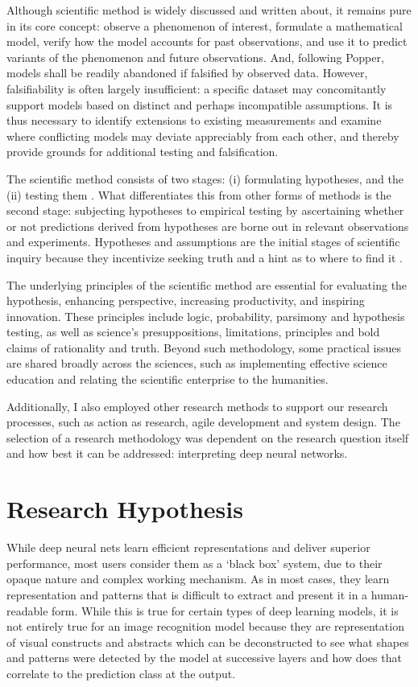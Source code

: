 Although scientific method \cite{2016397} is widely discussed and written about, it remains pure in its core concept: observe a phenomenon of interest, formulate a mathematical model, verify how the model accounts for past observations, and use it to predict variants of the phenomenon and future observations. And, following Popper, models shall be readily abandoned if falsified by observed data. However, falsifiability is often largely insufficient: a specific dataset may concomitantly support models based on distinct and perhaps incompatible assumptions. It is thus necessary to identify extensions to existing measurements and examine where conflicting models may deviate appreciably from each other, and thereby provide grounds for additional testing and falsification.

The scientific method consists of two stages: (i) formulating hypotheses, and the (ii) testing them \cite{2016397}. What differentiates this from other forms of methods is the second stage: subjecting hypotheses to empirical testing by ascertaining whether or not predictions derived from hypotheses are borne out in relevant observations and experiments. Hypotheses and assumptions are the initial stages of scientific inquiry because they incentivize seeking truth and a hint as to where to find it \cite{AYALA2016xi}.

The underlying principles of the scientific method \cite{gauch_jr_2012} are essential for evaluating the hypothesis, enhancing perspective, increasing productivity, and inspiring innovation. These principles include logic, probability, parsimony and hypothesis testing, as well as science’s presuppositions, limitations, principles and bold claims of rationality and truth. Beyond such methodology, some practical issues are shared broadly across the sciences, such as implementing effective science education and relating the scientific enterprise to the humanities.

Additionally, I also employed other research methods to support our research processes, such as action as research, agile development and system design. The selection of a research methodology was dependent on the research question itself and how best it can be addressed: interpreting deep neural networks.

\section{Research Hypothesis}

While deep neural nets learn efficient representations and deliver superior performance, most users consider them as a ‘black box’ system, due to their opaque nature and complex working mechanism. As in most cases, they learn representation and patterns that is difficult to extract and present it in a human-readable form. While this is true for certain types of deep learning models, it is not entirely true for an image recognition model because they are representation of visual constructs and abstracts which can be deconstructed to see what shapes and patterns were detected by the model at successive layers \cite{Zeiler} and how does that correlate to the prediction class at the output.

